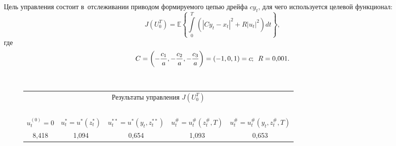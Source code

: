 \begin{multicols}{2}
     Цель управления состоит в~отслеживании приводом формируемого 
цепью дрейфа $cy_t$, для чего используется целевой функционал:
     \begin{equation}
     J\left( U_0^T\right) =\mathbb{E}\left\{ \int\limits_0^T \left( \left\vert C y_t-
x_t \right\vert^2 +R\left\vert u_t\right\vert^2\right) dt\right\},
     \label{e13-bos}
     \end{equation}
где 
$$
C=\left( -\displaystyle\frac{\displaystyle c_1\mathstrut}{\displaystyle a\mathstrut}, -\displaystyle\frac{\displaystyle c_2\mathstrut}{\displaystyle a\mathstrut}, -\displaystyle\frac{\displaystyle c_3\mathstrut}{\displaystyle a\mathstrut}\right) = (-1,0,1) =c;\enskip 
R=0{,}001.
$$

\setcounter{figure}{1}
\begin{figure*} %
\vspace*{1pt}
  \begin{center}
 \mbox{%
 \epsfxsize=163mm 
 }
\end{center}
\vspace*{-9pt}
\vspace*{9pt}
\begin{center}
{\small \begin{tabular}{|c|c|c|c|c|}
\multicolumn{5}{c}{Результаты управления $J(U_0^T)$}\\
\multicolumn{5}{c}{\ }\\[-6pt] 
\hline
$u_t^{(0)}=0$&$u_t^*=u^*(z_t^*)$&$u_t^{**}=u^*(y_t, z_t^{**})$&$u_t^\#= u_t^\# 
(z_t^\#, T)$ &$u_t^\# =u_t^\# (y_t, z_t^\#, T)$\\
\hline
8,418&1,094&0,654&1,093&0,653\\
\hline
\end{tabular}
}
\end{center}
\end{figure*}
     
    


\end{multicols}
